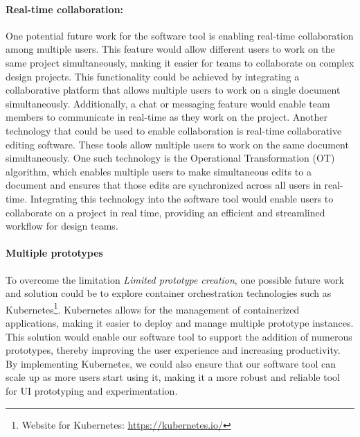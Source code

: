\paragraph{Real-time collaboration:}
One potential future work for the software tool is enabling real-time collaboration among multiple users. 
This feature would allow different users to work on the same project simultaneously, making it easier for teams to collaborate on complex design projects. 
This functionality could be achieved by integrating a collaborative platform that allows multiple users to work on a single document simultaneously. 
Additionally, a chat or messaging feature would enable team members to communicate in real-time as they work on the project.
Another technology that could be used to enable collaboration is real-time collaborative editing software. 
These tools allow multiple users to work on the same document simultaneously. 
One such technology is the Operational Transformation (OT) algorithm, which enables multiple users to make simultaneous edits to a document and ensures that those edits are synchronized across all users in real-time. 
Integrating this technology into the software tool would enable users to collaborate on a project in real time, providing an efficient and streamlined workflow for design teams.

\paragraph{Multiple prototypes}
To overcome the limitation \textit{Limited prototype creation}, one possible future work and solution could be to explore container orchestration technologies such as Kubernetes\footnote{Website for Kubernetes: \url{https://kubernetes.io/}}. 
Kubernetes allows for the management of containerized applications, making it easier to deploy and manage multiple prototype instances. 
This solution would enable our software tool to support the addition of numerous prototypes, thereby improving the user experience and increasing productivity. 
By implementing Kubernetes, we could also ensure that our software tool can scale up as more users start using it, making it a more robust and reliable tool for UI prototyping and experimentation.